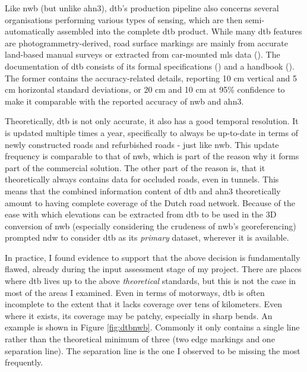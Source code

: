 Like \ac{nwb} (but unlike \ac{ahn3}), \ac{dtb}’s production pipeline also concerns several organisations performing various types of sensing, which are then semi-automatically assembled into the complete \ac{dtb} product. While many \ac{dtb} features are photogrammetry-derived, road surface markings are mainly from accurate land-based manual surveys or extracted from car-mounted \ac{mls} data (\cite{oudeElberink_vosselman_2012}). The documentation of \ac{dtb} consists of its formal specifications (\cite{dtb_docs}) and a handbook (\cite{dtb_handbook}). The former contains the accuracy-related details, reporting 10 cm vertical and 5 cm horizontal standard deviations, or 20 cm and 10 cm at 95\% confidence to make it comparable with the reported accuracy of \ac{nwb} and \ac{ahn3}.

Theoretically, \ac{dtb} is not only accurate, it also has a good temporal resolution. It is updated multiple times a year, specifically to always be up-to-date in terms of newly constructed roads and refurbished roads - just like \ac{nwb}. This update frequency is comparable to that of \ac{nwb}, which is part of the reason why it forms part of the commercial solution. The other part of the reason is, that it theoretically always contains data for occluded roads, even in tunnels. This means that the combined information content of \ac{dtb} and \ac{ahn3} theoretically amount to having complete coverage of the Dutch road network. Because of the ease with which elevations can be extracted from \ac{dtb} to be used in the 3D conversion of \ac{nwb} (especially considering the crudeness of \ac{nwb}'s georeferencing) prompted \ac{ndw} to consider \ac{dtb} as its \textit{primary} dataset, wherever it is available.

In practice, I found evidence to support that the above decision is fundamentally flawed, already during the input assessment stage of my project. There are places where \ac{dtb} lives up to the above \textit{theoretical} standards, but this is not the case in most of the areas I examined. Even in terms of motorways, \ac{dtb} is often incomplete to the extent that it lacks coverage over tens of kilometers. Even where it exists, its coverage may be patchy, especially in sharp bends. An example is shown in Figure \ref{fig:dtbnwb}. Commonly it only contains a single line rather than the theoretical minimum of three (two edge markings and one separation line). The separation line is the one I observed to be missing the most frequently.

